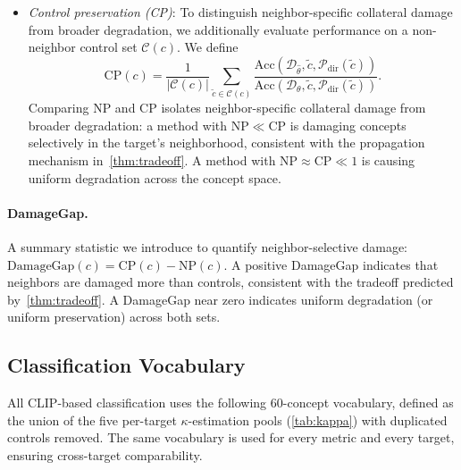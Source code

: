 \begin{itemize}
    \item \emph{Control preservation (CP)}: To distinguish neighbor-specific collateral damage from broader degradation, we additionally evaluate performance on a non-neighbor control set $\mathcal{C}(c)$. We define
    \begin{equation}
    \label{eq:cp}
    \mathrm{CP}(c) = \frac{1}{|\mathcal{C}(c)|} \sum_{\tilde c \in \mathcal{C}(c)} 
    \frac{\mathrm{Acc}(\mathcal{D}_{\hat\theta}, \tilde c, \mathcal{P}_{\mathrm{dir}}(\tilde c))}
     {\mathrm{Acc}(\mathcal{D}_\theta, \tilde c, \mathcal{P}_{\mathrm{dir}}(\tilde c))}.
    \end{equation}
    Comparing NP and CP isolates neighbor-specific collateral damage from broader degradation: a method with $\mathrm{NP} \ll \mathrm{CP}$ is damaging concepts selectively in the target's neighborhood, consistent with the propagation mechanism in~\cref{thm:tradeoff}. A method with $\mathrm{NP} \approx \mathrm{CP} \ll 1$ is causing uniform degradation across the concept space.
\end{itemize}




\paragraph{DamageGap.} A summary statistic we introduce to quantify neighbor-selective damage: $\mathrm{DamageGap}(c) = \mathrm{CP}(c) - \mathrm{NP}(c)$. A positive DamageGap indicates that neighbors are damaged more than controls, consistent with the tradeoff predicted by~\cref{thm:tradeoff}. A DamageGap near zero indicates uniform degradation (or uniform preservation) across both sets.

\subsection{Classification Vocabulary}
\label{app:vocab}
All CLIP-based classification uses the following 60-concept vocabulary, defined as the union of the five per-target $\kappa$-estimation pools (\cref{tab:kappa}) with duplicated controls removed. The same vocabulary is used for every metric and every target, ensuring cross-target comparability.

